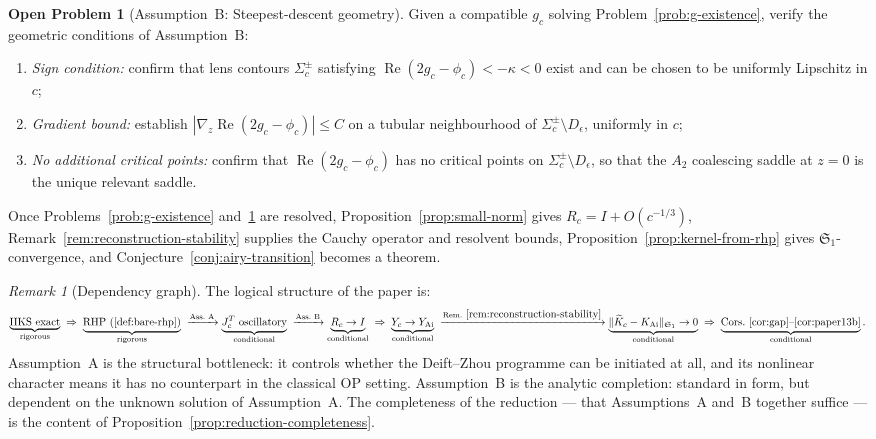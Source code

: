 \documentclass[12pt,a4paper]{amsart}
\theoremstyle{definition}
\newtheorem{problem}[theorem]{Open Problem}
\theoremstyle{remark}
\newtheorem{remark}[theorem]{Remark}
\newcommand{\norm}[1]{\|#1\|}
\begin{document}
\begin{problem}[Assumption~B: Steepest-descent geometry]
\label{prob:rh-programme}
Given a compatible $g_c$ solving Problem~\ref{prob:g-existence},
verify the geometric conditions of Assumption~B:
\begin{enumerate}[label=(\roman*)]
\item \emph{Sign condition:}
  confirm that lens contours $\Sigma_c^\pm$ satisfying
  $\operatorname{Re}(2g_c - \phi_c) < -\kappa < 0$ exist and can be
  chosen to be uniformly Lipschitz in $c$;
\item \emph{Gradient bound:}
  establish $|\nabla_z \operatorname{Re}(2g_c - \phi_c)| \le C$
  on a tubular neighbourhood of $\Sigma_c^\pm \setminus D_\epsilon$,
  uniformly in $c$;
\item \emph{No additional critical points:}
  confirm that $\operatorname{Re}(2g_c - \phi_c)$ has no critical
  points on $\Sigma_c^\pm \setminus D_\epsilon$, so that the $A_2$
  coalescing saddle at $z=0$ is the unique relevant saddle.
\end{enumerate}
Once Problems~\ref{prob:g-existence} and~\ref{prob:rh-programme} are
resolved, Proposition~\ref{prop:small-norm} gives $R_c = I + O(c^{-1/3})$,
Remark~\ref{rem:reconstruction-stability} supplies the Cauchy operator
and resolvent bounds, Proposition~\ref{prop:kernel-from-rhp}
gives $\mathfrak{S}_1$-convergence, and
Conjecture~\ref{conj:airy-transition} becomes a theorem.
\end{problem}

\begin{remark}[Dependency graph]
The logical structure of the paper is:
\[
  \underbrace{\text{IIKS exact}}_{\text{rigorous}}
  \;\Rightarrow\;
  \underbrace{\text{RHP}~(\ref{def:bare-rhp})}_{\text{rigorous}}
  \;\xrightarrow{\text{Ass.~A}}
  \underbrace{J_c^T \text{ oscillatory}}_{\text{conditional}}
  \;\xrightarrow{\text{Ass.~B}}
  \underbrace{R_c\to I}_{\text{conditional}}
  \;\Rightarrow\;
  \underbrace{Y_c\to Y_{\mathrm{Ai}}}_{\text{conditional}}
  \;\xrightarrow{\text{Rem.}~\ref{rem:reconstruction-stability}}
  \underbrace{\norm{\widetilde{K}_c - K_{\mathrm{Ai}}}_{\mathfrak{S}_1}
  \to 0}_{\text{conditional}}
  \;\Rightarrow\;
  \underbrace{\text{Cors.~\ref{cor:gap}--\ref{cor:paper13b}}}_{\text{conditional}}.
\]
Assumption~A is the structural bottleneck: it controls whether the
Deift--Zhou programme can be initiated at all, and its nonlinear
character means it has no counterpart in the classical OP setting.
Assumption~B is the analytic completion: standard in form, but
dependent on the unknown solution of Assumption~A.
The completeness of the reduction --- that Assumptions~A and~B
together suffice --- is the content of
Proposition~\ref{prop:reduction-completeness}.
\end{remark}
\end{document}
